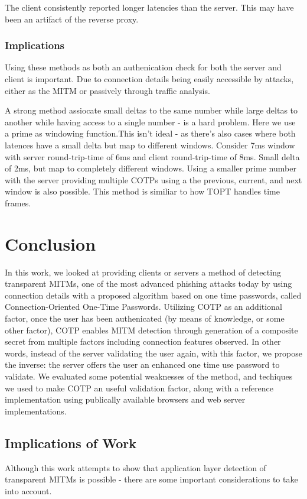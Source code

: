 \documentclass[a4paper, 11pt]{article} 				%
\begin{document}
The client consistently reported longer latencies than the server. This may have been an artifact of the reverse proxy.

\subsubsection{Implications}
Using these methods as both an authenication check for both the server and client is important. Due to connection details being easily accessible by attacks, either as the MITM or passively through traffic analysis. 

A strong method assiocate small deltas to the same number while large deltas to another while having access to a single number - is a hard problem. Here we use a prime as windowing function.This isn't ideal - as there's also cases where both latences have a small delta but map to different windows. Consider 7ms window with server round-trip-time of 6ms and client round-trip-time of 8ms. Small delta of 2ms, but map to completely different windows. Using a smaller prime number with the server providing multiple COTPs using a the previous, current, and next window is also possible. This method is similiar to how TOPT handles time frames.

\section{Conclusion}
In this work, we looked at providing clients or servers a method of detecting transparent MITMs, one of the most advanced phishing attacks today by using connection details with a proposed algorithm based on one time passwords, called Connection-Oriented One-Time Passwords. Utilizing COTP as an additional factor, once the user has been authenicated (by means of knowledge, or some other factor), COTP enables MITM detection through generation of a composite secret from multiple factors including connection features observed. In other words, instead of the server validating the user again, with this factor, we propose the inverse: the server offers the user an enhanced one time use password to validate. We evaluated some potential weaknesses of the method, and techiques we used to make COTP an useful validation factor, along with a reference implementation using publically available browsers and web server implementations.

\subsection{Implications of Work}
Although this work attempts to show that application layer detection of transparent MITMs is possible - there are some important considerations to take into account.
\end{document}
